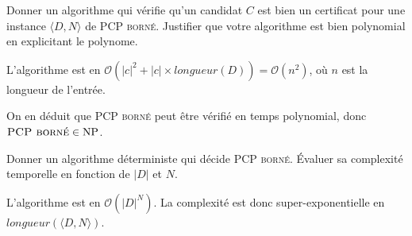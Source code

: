 \begin{exercice}
  \ifcorrection{\newpage}
  \begin{questions}
  \item Donner un algorithme qui vérifie qu'un candidat $C$
    est bien un certificat pour une instance $\langle D, N \rangle$ de \textsc{PCP borné}.
    Justifier que votre algorithme est bien polynomial en explicitant le polynome.
  \end{questions}
  \begin{corrections}
    \begin{algorithm}[H]
    \end{algorithm}

    L'algorithme est en $\mathcal{O}(|c|^2 + |c| \times \mathit{longueur}(D)) = \mathcal{O}(n^2)$, où $n$ est la longueur de l'entrée.
  \end{corrections}

  
  On en déduit que \textsc{PCP borné} peut être vérifié en temps polynomial, donc $\textsc{PCP borné} \in \text{NP}$.

  \begin{questions}
  \item Donner un algorithme déterministe qui décide \textsc{PCP borné}.
    Évaluer sa complexité temporelle en fonction de $|D|$ et $N$.
  \end{questions}
  \begin{corrections}
    \begin{algorithm}[H]
    \end{algorithm}
    L'algorithme est en $\mathcal{O}(|D|^N)$. La complexité est donc super-exponentielle en $\mathit{longueur}(\langle D, N\rangle)$. 
  \end{corrections}
\end{exercice}

\endgroup
\endinput
